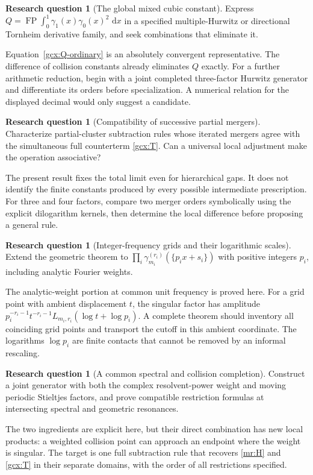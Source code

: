 \documentclass[11pt]{article}
\numberwithin{equation}{section}
\theoremstyle{plain}
\theoremstyle{definition}
\newtheorem{question}[theorem]{Research question}
\theoremstyle{remark}
\DeclareMathOperator{\FP}{FP}
\newcommand{\dd}{\,\mathrm d}
\begin{document}
\begin{question}[The global mixed cubic constant]
Express
$Q=\FP\int_0^1\gamma_1(x)\gamma_0(x)^2\,\dd x$
in a specified multiple-Hurwitz or directional Tornheim derivative
family, and seek combinations that eliminate it.
\end{question}
Equation~\eqref{gcx:Q-ordinary} is an absolutely convergent representative.
The difference of collision constants already eliminates $Q$ exactly.
For a further arithmetic reduction, begin with a joint completed
three-factor Hurwitz generator and differentiate its orders before
specialization. A numerical relation for the displayed decimal would
only suggest a candidate.

\begin{question}[Compatibility of successive partial mergers]
Characterize partial-cluster subtraction rules whose iterated mergers
agree with the simultaneous full counterterm \eqref{gcx:T}.
Can a universal local adjustment make the operation associative?
\end{question}
The present result fixes the total limit even for hierarchical gaps.
It does not identify the finite constants produced by every possible
intermediate prescription. For three and four factors, compare two
merger orders symbolically using the explicit dilogarithm kernels,
then determine the local difference before proposing a general rule.

\begin{question}[Integer-frequency grids and their logarithmic scales]
Extend the geometric theorem to
$\prod_i\gamma_{m_i}^{(r_i)}(\{p_i x+s_i\})$ with positive integers
$p_i$, including analytic Fourier weights.
\end{question}
The analytic-weight portion at common unit frequency is proved here.
For a grid point with ambient displacement $t$, the singular factor
has amplitude
$p_i^{-r_i-1}t^{-r_i-1}L_{m_i,r_i}(\log t+\log p_i)$.
A complete theorem should inventory all coinciding grid points and
transport the cutoff in this ambient coordinate. The logarithms
$\log p_i$ are finite contacts that cannot be removed by an informal
rescaling.

\begin{question}[A common spectral and collision completion]
Construct a joint generator with both the complex resolvent-power
weight and moving periodic Stieltjes factors, and prove compatible
restriction formulas at intersecting spectral and geometric resonances.
\end{question}
The two ingredients are explicit here, but their direct combination
has new local products: a weighted collision point can approach an
endpoint where the weight is singular. The target is one full
subtraction rule that recovers \eqref{mr:H} and \eqref{gcx:T} in
their separate domains, with the order of all restrictions specified.
\end{document}
